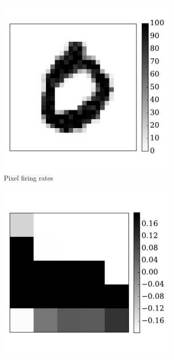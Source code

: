		\begin{figure}[tbh!]
		\centering
		\begin{subfigure}[t]{0.3\textwidth}
			\includegraphics[width=\textwidth]{pics_iconip/6-2.pdf}
			\caption{Pixel firing rates}
			\label{Fig:62}
		\end{subfigure}
		\begin{subfigure}[t]{0.3\textwidth}
			\includegraphics[width=\textwidth]{pics_iconip/6-3.pdf}

\end{subfigure}
\end{figure}
